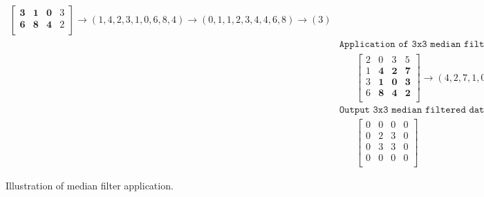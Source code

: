 \documentclass[11pt,fleqn]{article}
\begin{document}
\begin{figure}
{\begin{equation*}
\begin{aligned}
\begin{bmatrix}
\mathbf{3} & \mathbf{1} & \mathbf{0} & 3 \\
\mathbf{6} & \mathbf{8} & \mathbf{4} & 2 \\ 
\end{bmatrix} 
\rightarrow (1, 4, 2, 3, 1, 0, 6, 8, 4) \rightarrow (0, 1, 1, 2, 3, 4, 4, 6, 8) \rightarrow (3) \\[10pt]
%
& \texttt{Application of 3x3 median filter to the $(3,3)$ interior filter location}\\
& \hspace{20pt} \begin{bmatrix}
2 & 0 & 3 & 5 \\
1 & \mathbf{4} & \mathbf{2} & \mathbf{7} \\
3 & \mathbf{1} & \mathbf{0} & \mathbf{3} \\
6 & \mathbf{8} & \mathbf{4} & \mathbf{2} \\ 
\end{bmatrix} 
\rightarrow (4, 2, 7, 1, 0, 3, 8, 4, 2) \rightarrow (0, 1, 2, 2, 3, 4, 4, 7, 8) \rightarrow (3) \\[10pt]
%
& \texttt{Output 3x3 median filtered data, with edge locations zeroed}\\
& \hspace{20pt} \begin{bmatrix}
0 & 0 & 0 & 0 \\
0 & 2 & 3 & 0 \\
0 & 3 & 3 & 0 \\
0 & 0 & 0 & 0 \\ 
\end{bmatrix}
\end{aligned}
\end{equation*}
\vspace{20pt}
}
\caption[Illustration of median filter application]{Illustration of median filter application.}
\label{fig:median_illustrate}
\end{figure}
\end{document}
